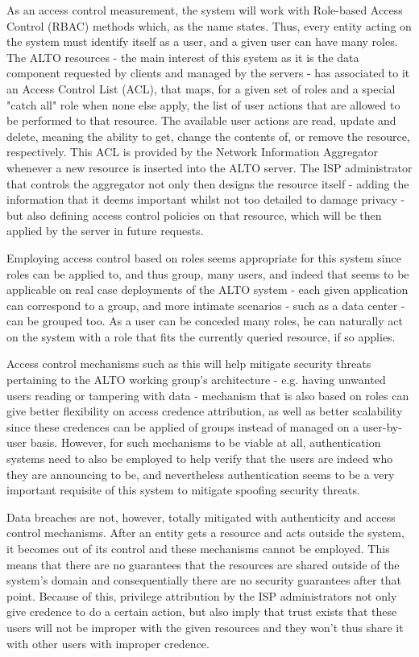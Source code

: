     As an access control measurement, the system will work with Role-based Access Control (RBAC) methods which, as the name states.
    Thus, every entity acting on the system must identify itself as a user, and a given user can have many roles.
    The ALTO resources - the main interest of this system as it is the data component requested by clients and managed by the servers - has associated to it an Access Control List (ACL), that maps, for a given set of roles and a special "catch all" role when none else apply, the list of user actions that are allowed to be performed to that resource.
    The available user actions are read, update and delete, meaning the ability to get, change the contents of, or remove the resource, respectively.
    This ACL is provided by the Network Information Aggregator whenever a new resource is inserted into the ALTO server.
    The ISP administrator that controls the aggregator not only then designs the resource itself - adding the information that it deems important whilst not too detailed to damage privacy - but also defining access control policies on that resource, which will be then applied by the server in future requests.

    Employing access control based on roles seems appropriate for this system since roles can be applied to, and thus group, many users, and indeed that seems to be applicable on real case deployments of the ALTO system - each given application can correspond to a group, and more intimate scenarios - such as a data center - can be grouped too.
    As a user can be conceded many roles, he can naturally act on the system with a role that fits the currently queried resource, if so applies.

    Access control mechanisms such as this will help mitigate security threats pertaining to the ALTO working group's architecture - e.g. having unwanted users reading or tampering with data - mechanism that is also based on roles can give better flexibility on access credence attribution, as well as better scalability since these credences can be applied of groups instead of managed on a user-by-user basis.
    However, for such mechanisms to be viable at all, authentication systems need to also be employed to help verify that the users are indeed who they are announcing to be, and nevertheless authentication seems to be a very important requisite of this system to mitigate spoofing security threats.

    Data breaches are not, however, totally mitigated with authenticity and access control mechanisms.
    After an entity gets a resource and acts outside the system, it becomes out of its control and these mechanisms cannot be employed.
    This means that there are no guarantees that the resources are shared outside of the system's domain and consequentially there are no security guarantees after that point.
    Because of this, privilege attribution by the ISP administrators not only give credence to do a certain action, but also imply that trust exists that these users will not be improper with the given resources and they won't thus share it with other users with improper credence.

